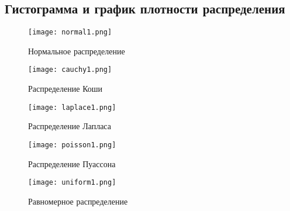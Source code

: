 \documentclass[a4]{article}
\begin{document}
		\subsection{Гистограмма и график плотности распределения}	
			\begin{center}
				
				\begin{figure}[h]
					\texttt{[image: normal1.png]} 
					\caption[Нормальное распределение]{Нормальное распределение}
				\end{figure}
				\newpage
				\begin{figure}
					\texttt{[image: cauchy1.png]}
					\caption[Распределение Коши]{Распределение Коши}
				\end{figure}
				\newpage
				\begin{figure}
					\texttt{[image: laplace1.png]}
					\caption[Распределение Лапласа]{Распределение Лапласа}
				\end{figure}
				\newpage
				\begin{figure}
					\texttt{[image: poisson1.png]}
					\caption[Распределение Пуассона]{Распределение Пуассона}
				\end{figure}
				\newpage
				\begin{figure}
					\texttt{[image: uniform1.png]}
					\caption[Равномерное распределение]{Равномерное распределение}
				\end{figure}
				
		\end{center}
		\newpage
\end{document}
